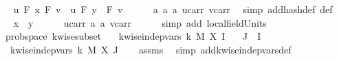 \begin{isabellebody}
\isanewline
\ \ \isamarkupfalse%
\ {\isachardoublequoteopen}u\ {\isasymotimes}\isactrlbsub F\isactrlesub \ x\ {\isasymoplus}\isactrlbsub F\isactrlesub \ v\ {\isacharequal}{\kern0pt}\ u\ {\isasymotimes}\isactrlbsub F\isactrlesub \ y\ \ {\isasymoplus}\isactrlbsub F\isactrlesub \ v{\isachardoublequoteclose}\isanewline
\ \ \ \ \isamarkupfalse%
\ a{}\ a{}\ a{}\ u{\isacharunderscore}{\kern0pt}carr\ v{\isacharunderscore}{\kern0pt}carr\ \isamarkupfalse%
\ {\isacharparenleft}{\kern0pt}simp\ add{\isacharcolon}{\kern0pt}hash{\isacharunderscore}{\kern0pt}def\ {\isasymomega}{\isacharunderscore}{\kern0pt}def{\isacharparenright}{\kern0pt}\isanewline
\isanewline
\ \ \isamarkupfalse%
\ {\isachardoublequoteopen}x\ {\isacharequal}{\kern0pt}\ y{\isachardoublequoteclose}\isanewline
\ \ \ \ \isamarkupfalse%
\ u{\isacharunderscore}{\kern0pt}carr\ a{}\ a{}\ v{\isacharunderscore}{\kern0pt}carr\isanewline
\ \ \ \ \isamarkupfalse%
\ {\isacharparenleft}{\kern0pt}simp\ add{\isacharcolon}{\kern0pt}\ local{\isachardot}{\kern0pt}field{\isacharunderscore}{\kern0pt}Units{\isacharparenright}{\kern0pt}\isanewline
{}\isamarkupfalse%
%
\endisatagproof
{\isafoldproof}%
%
\isadelimproof
\isanewline
%
\endisadelimproof
\isanewline
{}\isamarkupfalse%
\ {\isacharparenleft}{\kern0pt}\ prob{\isacharunderscore}{\kern0pt}space{\isacharparenright}{\kern0pt}\ k{\isacharunderscore}{\kern0pt}wise{\isacharunderscore}{\kern0pt}subset{\isacharcolon}{\kern0pt}\isanewline
\ \ \ {\isachardoublequoteopen}k{\isacharunderscore}{\kern0pt}wise{\isacharunderscore}{\kern0pt}indep{\isacharunderscore}{\kern0pt}vars\ k\ M{\isacharprime}{\kern0pt}\ X{\isacharprime}{\kern0pt}\ I{\isachardoublequoteclose}\isanewline
\ \ \ {\isachardoublequoteopen}J\ {\isasymsubseteq}\ I{\isachardoublequoteclose}\isanewline
\ \ \ {\isachardoublequoteopen}k{\isacharunderscore}{\kern0pt}wise{\isacharunderscore}{\kern0pt}indep{\isacharunderscore}{\kern0pt}vars\ k\ M{\isacharprime}{\kern0pt}\ X{\isacharprime}{\kern0pt}\ J{\isachardoublequoteclose}\isanewline
%
\isadelimproof
\ \ %
\endisadelimproof
%
\isatagproof
{}\isamarkupfalse%
\ assms\ \isamarkupfalse%
\ {\isacharparenleft}{\kern0pt}simp\ add{\isacharcolon}{\kern0pt}k{\isacharunderscore}{\kern0pt}wise{\isacharunderscore}{\kern0pt}indep{\isacharunderscore}{\kern0pt}vars{\isacharunderscore}{\kern0pt}def{\isacharparenright}{\kern0pt}%
\endisatagproof
{\isafoldproof}%
%
\isadelimproof
\isanewline
%
\endisadelimproof
%
\isadelimtheory
\isanewline
%
\endisadelimtheory
%
\isatagtheory
{}\isamarkupfalse%
%
\endisatagtheory
{\isafoldtheory}%
%
\isadelimtheory
%
\endisadelimtheory
%
\end{isabellebody}%
